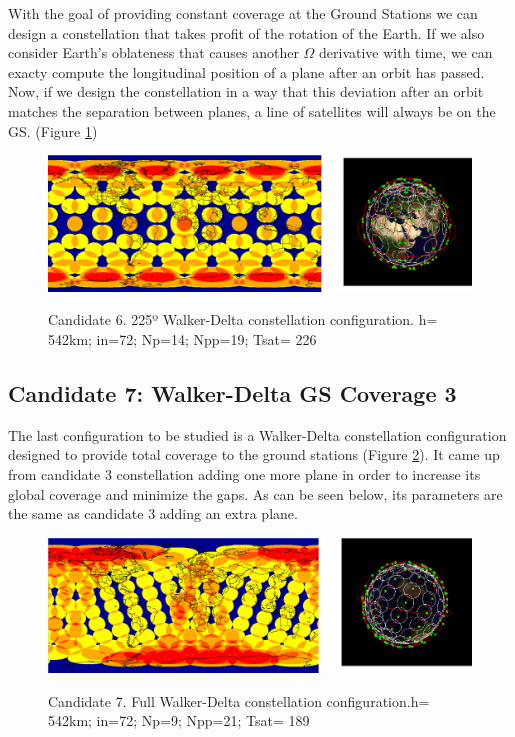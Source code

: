 With the goal of providing constant coverage at the Ground Stations we can design a constellation that takes profit of the rotation of the Earth. If we also consider Earth's oblateness that causes another $\Omega$ derivative with time, we can exacty compute the longitudinal position of a plane after an orbit has passed. Now, if we design the constellation in a way that this deviation after an orbit matches the separation between planes, a line of satellites will always be on the GS. (Figure \ref{fig:Candidate6})

\begin{figure}%
	\centering
	\includegraphics[width=1\textwidth]{Candidate6.png}\\
	\caption{Candidate 6. 225º Walker-Delta constellation configuration. h= 542km; in=72; Np=14; Npp=19; Tsat= 226}
	\label{fig:Candidate6}
\end{figure}

\subsection{Candidate 7: Walker-Delta GS Coverage 3}

The last configuration to be studied is a Walker-Delta constellation configuration designed to provide total coverage to the ground stations (Figure \ref{fig:Candidate7}). It came up from candidate 3 constellation adding one more plane in order to increase its global coverage and minimize the gaps. As can be seen below, its parameters are the same as candidate 3 adding an extra plane.

\begin{figure}%
	\centering
	\includegraphics[width=1\textwidth]{Candidate7.png}\\
	\caption{Candidate 7. Full Walker-Delta constellation configuration.h= 542km; in=72; Np=9; Npp=21; Tsat= 189}
	\label{fig:Candidate7}
\end{figure}

